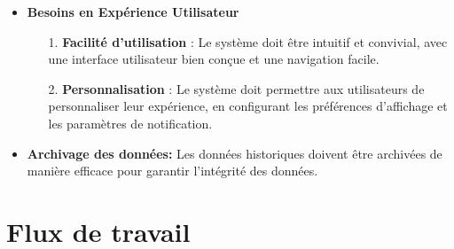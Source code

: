 \begin{itemize}
        \item\textbf{Besoins en Expérience Utilisateur}
    
                \begin{enumerate}
                    \item[1.] \textbf{Facilité d'utilisation} : Le système doit être intuitif et convivial, avec une interface utilisateur bien conçue et une navigation facile.
                    
                    \item[2.] \textbf{Personnalisation} : Le système doit permettre aux utilisateurs de personnaliser leur expérience, en configurant les préférences d'affichage et les paramètres de notification.
                \end{enumerate}
        \item \textbf{Archivage des données: }Les données historiques doivent être archivées de manière efficace pour garantir l'intégrité des données.
  \end{itemize}
  \section{Flux de travail}
  
